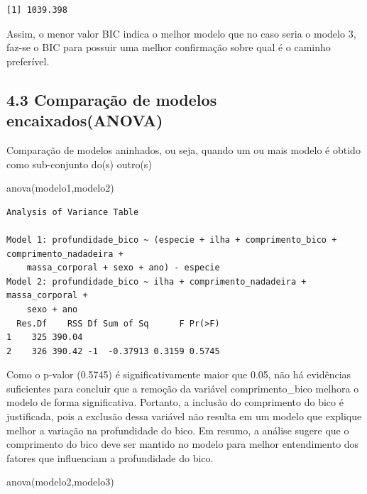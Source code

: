 \documentclass[
  letterpaper,
  DIV=11,
  numbers=noendperiod]{scrartcl}
\newenvironment{Shaded}{\begin{snugshade}}{\end{snugshade}}
\newcommand{\FunctionTok}[1]{\textcolor[rgb]{0.28,0.35,0.67}{#1}}
\newcommand{\NormalTok}[1]{\textcolor[rgb]{0.00,0.23,0.31}{#1}}
\begin{document}
\begin{verbatim}
[1] 1039.398
\end{verbatim}

Assim, o menor valor BIC indica o melhor modelo que no caso seria o
modelo 3, faz-se o BIC para possuir uma melhor confirmação sobre qual é
o caminho preferível.

\subsection{4.3 Comparação de modelos
encaixados(ANOVA)}\label{comparauxe7uxe3o-de-modelos-encaixadosanova}

Comparação de modelos aninhados, ou seja, quando um ou mais modelo é
obtido como sub-conjunto do(s) outro(s)

\begin{Shaded}
\begin{Highlighting}[]
\FunctionTok{anova}\NormalTok{(modelo1,modelo2)}
\end{Highlighting}
\end{Shaded}

\begin{verbatim}
Analysis of Variance Table

Model 1: profundidade_bico ~ (especie + ilha + comprimento_bico + comprimento_nadadeira + 
    massa_corporal + sexo + ano) - especie
Model 2: profundidade_bico ~ ilha + comprimento_nadadeira + massa_corporal + 
    sexo + ano
  Res.Df    RSS Df Sum of Sq      F Pr(>F)
1    325 390.04                           
2    326 390.42 -1  -0.37913 0.3159 0.5745
\end{verbatim}

Como o p-valor (0.5745) é significativamente maior que 0.05, não há
evidências suficientes para concluir que a remoção da variável
comprimento\_bico melhora o modelo de forma significativa. Portanto, a
inclusão do comprimento do bico é justificada, pois a exclusão dessa
variável não resulta em um modelo que explique melhor a variação na
profundidade do bico. Em resumo, a análise sugere que o comprimento do
bico deve ser mantido no modelo para melhor entendimento dos fatores que
influenciam a profundidade do bico.

\begin{Shaded}
\begin{Highlighting}[]
\FunctionTok{anova}\NormalTok{(modelo2,modelo3)}
\end{Highlighting}
\end{Shaded}
\end{document}
